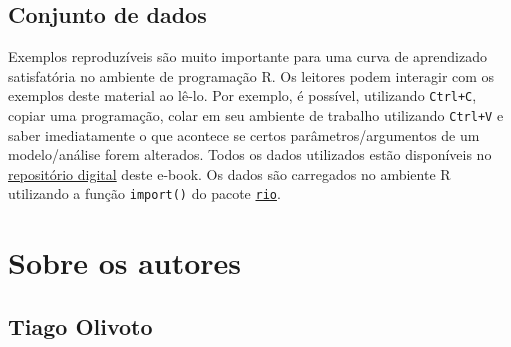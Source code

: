 \documentclass[
]{book}
\numberwithin{equation}{section}
\begin{document}
\hypertarget{conjunto-de-dados}{%
\section*{Conjunto de dados}\label{conjunto-de-dados}}

Exemplos reproduzíveis são muito importante para uma curva de aprendizado satisfatória no ambiente de programação R. Os leitores podem interagir com os exemplos deste material ao lê-lo. Por exemplo, é possível, utilizando \texttt{Ctrl+C}, copiar uma programação, colar em seu ambiente de trabalho utilizando \texttt{Ctrl+V} e saber imediatamente o que acontece se certos parâmetros/argumentos de um modelo/análise forem alterados. Todos os dados utilizados estão disponíveis no \href{https://github.com/TiagoOlivoto/e-bookr/tree/master/data}{repositório digital} deste e-book. Os dados são carregados no ambiente R utilizando a função \texttt{import()} do pacote \href{https://cran.r-project.org/web/packages/rio/index.html}{\texttt{rio}}.

\hypertarget{sobre-os-autores}{%
\chapter*{Sobre os autores}\label{sobre-os-autores}}

\hypertarget{tiago-olivoto}{%
\section*{Tiago Olivoto}\label{tiago-olivoto}}
\end{document}
